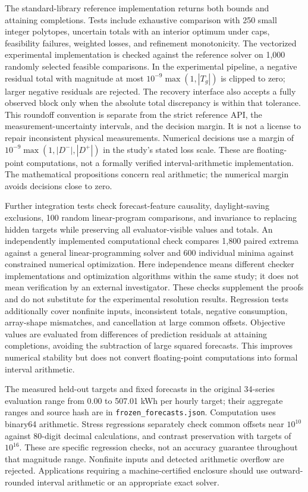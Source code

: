 \documentclass[12pt]{article}
\begin{document}
The standard-library reference implementation returns both bounds and
attaining completions. Tests include exhaustive comparison with 250
small integer polytopes, uncertain totals with an interior optimum under
caps, feasibility failures, weighted losses, and refinement monotonicity.
The vectorized experimental implementation is checked against the reference
solver on 1,000 randomly selected feasible comparisons. In the experimental
pipeline, a negative residual total with magnitude at most
$10^{-9}\max(1,|T_g|)$ is clipped to zero; larger negative residuals are
rejected. The recovery interface also accepts a fully observed block only
when the absolute total discrepancy is within that tolerance. This
roundoff convention is separate from the strict reference API, the
measurement-uncertainty intervals, and the decision margin. It is not a
license to repair inconsistent physical measurements. Numerical decisions
use a margin of $10^{-9}\max(1,|D^-|,|D^+|)$ in the study's stated loss
scale. These are floating-point computations, not a formally verified
interval-arithmetic implementation. The mathematical propositions concern
real arithmetic; the numerical margin avoids decisions close to zero.

Further integration tests check forecast-feature causality,
daylight-saving exclusions, 100 random linear-program comparisons, and
invariance to replacing hidden targets while preserving all evaluator-visible
values and totals. An independently implemented computational check compares 1,800 paired
extrema against a general linear-programming solver and 600 individual
minima against constrained numerical optimization. Here independence means
different checker implementations and optimization algorithms within the
same study; it does not mean verification by an external investigator.
These checks supplement
the proofs and do not substitute for the experimental resolution results.
Regression tests additionally cover nonfinite inputs, inconsistent totals,
negative consumption, array-shape mismatches, and cancellation at large
common offsets. Objective values are evaluated from differences of prediction
residuals at attaining completions, avoiding the subtraction of large
squared forecasts. This improves numerical stability but does not convert
floating-point computations into formal interval arithmetic.

The measured held-out targets and fixed forecasts in the original
34-series evaluation range from 0.00 to 507.01 kWh per hourly target;
their aggregate ranges and source hash are in \texttt{frozen\_forecasts.json}.
Computation uses binary64 arithmetic. Stress regressions separately check
common offsets near $10^{10}$ against 80-digit decimal calculations, and
contrast preservation with targets of $10^{16}$. These are specific
regression checks, not an accuracy guarantee throughout that magnitude
range. Nonfinite inputs and detected arithmetic overflow are rejected.
Applications requiring a machine-certified enclosure should use
outward-rounded interval arithmetic or an appropriate exact solver.
\end{document}
